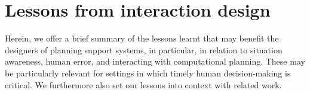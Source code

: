 






\section{Lessons from interaction design} 
Herein, we offer a brief summary of the lessons learnt that may benefit the designers of planning support systems, in particular, in relation to situation awareness, human error, and interacting with computational planning. These may be particularly relevant for settings in which timely human decision-making is critical. We furthermore also set our lessons into context with related work.


